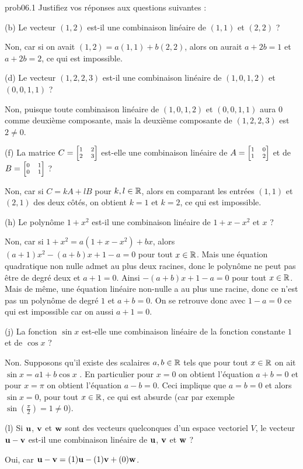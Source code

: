 
\begin{sol}{prob06.1} Justifiez vos réponses aux questions suivantes :
\medskip

(b) Le vecteur $(1,2)$ est-il une combinaison linéaire de $(1,1)$ et $(2,2)$ ?

\soln Non, car si on avait $(1,2)=a(1,1)+b(2,2)$, alors on aurait $a+2b=1$ et $a+2b=2$, ce qui est impossible. 
\medskip

(d) Le vecteur $(1,2,2,3)$ est-il une combinaison linéaire de $(1,0,1,2)$ et $(0,0,1,1)$ ?

\soln Non, puisque toute combinaison linéaire de $(1,0,1,2)$ et $(0,0,1,1)$ aura $0$ comme deuxième composante, mais la deuxième composante de $(1,2,2,3)$ est $2 \not=0$.
\medskip


(f)  La matrice $C=\scriptsize\bmatrix 1&2\\2&3\endbmatrix $ est-elle une combinaison linéaire de $A=\scriptsize\bmatrix 1&0\\1&2\endbmatrix $ et de $B=\scriptsize\bmatrix 0&1\\0&1\endbmatrix $ ?

\soln Non, car si $C=k A +l B$ pour $k,l \in \mathbb{R}$, alors en comparant les entrées $(1,1)$ et $(2,1)$ des deux côtés, on obtient $k=1$ et $k=2$, ce qui est impossible. 
\medskip


(h) Le polynôme $1+x^2$ est-il une combinaison linéaire de $1+x-x^2$ et $x$ ?

\soln Non, car si $1+x^2 =a(1+x-x^2)+bx$, alors $(a+1)x^2-(a+b)x +1-a=0$  pour tout $x\in \mathbb{R}$. Mais une équation quadratique non nulle admet au plus deux racines, donc le polynôme ne peut pas être de degré deux et $a+1=0$. Ainsi $-(a+b)x +1-a=0$ pour tout $x\in \mathbb{R}$. Mais de m\^eme, une équation linéaire non-nulle a au plus une racine, donc ce n'est pas un polynôme de degré $1$ et $a+b=0$. On se retrouve donc avec $1-a=0$ ce qui est impossible car on aussi $a+1=0$.  
\medskip

(j)  La fonction $\sin x$ est-elle une combinaison linéaire de la fonction constante $1$ et de $\cos x$ ?

\soln Non. Supposons qu'il existe des scalaires $a,b \in \mathbb{R}$ tels que pour tout $x\in \mathbb{R}$ on ait $\sin x =a 1+b\cos x$ . En particulier pour $x=0$ on obtient l'équation $a+b=0$ et pour $x=\pi$ on obtient l'équation $a-b=0$. Ceci implique que $a=b=0$ et alors $\sin x =0$, pour tout $x\in \mathbb{R}$, ce qui est absurde (car par exemple $\sin(\frac{\pi}2)=1\not=0$).
\medskip

(l)  Si $\mathbf{u}$, $\mathbf{v}$ et $\mathbf{w}$ sont des vecteurs quelconques d'un espace vectoriel $V$, le vecteur $\mathbf{u}-\mathbf{v}$ est-il une combinaison linéaire de $\mathbf{u}$, $\mathbf{v}$ et $\mathbf{w}$ ?

\soln Oui, car $\mathbf{u}-\mathbf{v} =(1) \mathbf{u} -(1) \mathbf{v} + (0) \mathbf{w}$.
\medskip

\end{sol}

